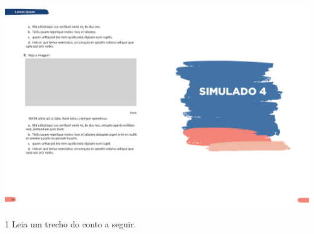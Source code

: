 \vspace*{-3.4cm}
\hspace*{-3.7cm}\includegraphics[scale=1]{../watermarks/4simulado5ano.pdf}
\pagebreak

\num{1} Leia um trecho do conto a seguir.

